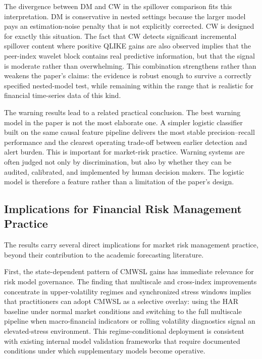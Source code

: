 The divergence between DM and CW in the spillover comparison fits this interpretation. DM is conservative in nested settings because the larger model pays an estimation-noise penalty that is not explicitly corrected. CW is designed for exactly this situation. The fact that CW detects significant incremental spillover content where positive QLIKE gains are also observed implies that the peer-index wavelet block contains real predictive information, but that the signal is moderate rather than overwhelming. This combination strengthens rather than weakens the paper's claims: the evidence is robust enough to survive a correctly specified nested-model test, while remaining within the range that is realistic for financial time-series data of this kind.

The warning results lead to a related practical conclusion. The best warning model in the paper is not the most elaborate one. A simpler logistic classifier built on the same causal feature pipeline delivers the most stable precision--recall performance and the clearest operating trade-off between earlier detection and alert burden. This is important for market-risk practice. Warning systems are often judged not only by discrimination, but also by whether they can be audited, calibrated, and implemented by human decision makers. The logistic model is therefore a feature rather than a limitation of the paper's design.

\subsection{Implications for Financial Risk Management Practice}
\label{subsec:risk_management_implications}

The results carry several direct implications for market risk management practice, beyond their contribution to the academic forecasting literature.

First, the state-dependent pattern of CMWSL gains has immediate relevance for risk model governance. The finding that multiscale and cross-index improvements concentrate in upper-volatility regimes and synchronized stress windows implies that practitioners can adopt CMWSL as a selective overlay: using the HAR baseline under normal market conditions and switching to the full multiscale pipeline when macro-financial indicators or rolling volatility diagnostics signal an elevated-stress environment. This regime-conditional deployment is consistent with existing internal model validation frameworks that require documented conditions under which supplementary models become operative.


